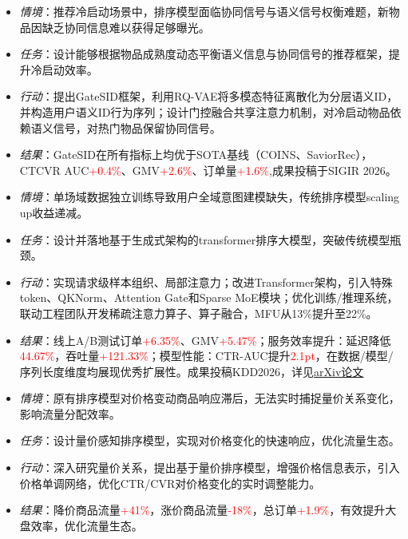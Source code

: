 \documentclass{resume}
\begin{document}
\begin{itemize}
  \item \textit{情境}：推荐冷启动场景中，排序模型面临协同信号与语义信号权衡难题，新物品因缺乏协同信息难以获得足够曝光。
  \item \textit{任务}：设计能够根据物品成熟度动态平衡语义信息与协同信号的推荐框架，提升冷启动效率。
  \item \textit{行动}：提出GateSID框架，利用RQ-VAE将多模态特征离散化为分层语义ID，并构造用户语义ID行为序列；设计门控融合共享注意力机制，对冷启动物品依赖语义信号，对热门物品保留协同信号。
  \item \textit{结果}：GateSID在所有指标上均优于SOTA基线（COINS、SaviorRec），CTCVR AUC\textcolor{red}{+0.4\%}、GMV\textcolor{red}{+2.6\%}、订单量\textcolor{red}{+1.6\%},成果投稿于SIGIR 2026。
\end{itemize}

\begin{itemize}
  \item \textit{情境}：单场域数据独立训练导致用户全域意图建模缺失，传统排序模型scaling up收益递减。
  \item \textit{任务}：设计并落地基于生成式架构的transformer排序大模型，突破传统模型瓶颈。
  \item \textit{行动}：实现请求级样本组织、局部注意力；改进Transformer架构，引入特殊token、QKNorm、Attention Gate和Sparse MoE模块；优化训练/推理系统，联动工程团队开发稀疏注意力算子、算子融合，MFU从13\%提升至22\%。
  \item \textit{结果}：线上A/B测试订单\textcolor{red}{+6.35\%}、GMV\textcolor{red}{+5.47\%}；服务效率提升：延迟降低\textcolor{red}{44.67\%}，吞吐量\textcolor{red}{+121.33\%}；模型性能：CTR-AUC提升\textcolor{red}{2.1pt}，在数据/模型/序列长度维度均展现优秀扩展性。成果投稿KDD2026，详见\href{https://arxiv.org/pdf/2603.03988}{arXiv论文}
\end{itemize}

\begin{itemize}
  \item \textit{情境}：原有排序模型对价格变动商品响应滞后，无法实时捕捉量价关系变化，影响流量分配效率。
  \item \textit{任务}：设计量价感知排序模型，实现对价格变化的快速响应，优化流量生态。
  \item \textit{行动}：深入研究量价关系，提出基于量价排序模型，增强价格信息表示，引入价格单调网络，优化CTR/CVR对价格变化的实时调整能力。
  \item \textit{结果}：降价商品流量\textcolor{red}{+41\%}，涨价商品流量\textcolor{red}{-18\%}，总订单\textcolor{red}{+1.9\%}，有效提升大盘效率，优化流量生态。
\end{itemize}
\end{document}
